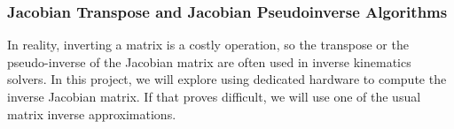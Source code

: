 \subsubsection*{Jacobian Transpose and Jacobian Pseudoinverse Algorithms}
In reality, inverting a matrix is a costly operation, so the transpose or the pseudo-inverse of the Jacobian matrix are often used in inverse kinematics solvers.\cite{ik_intro} In this project, we will explore using dedicated hardware to compute the inverse Jacobian matrix. If that proves difficult, we will use one of the usual matrix inverse approximations.